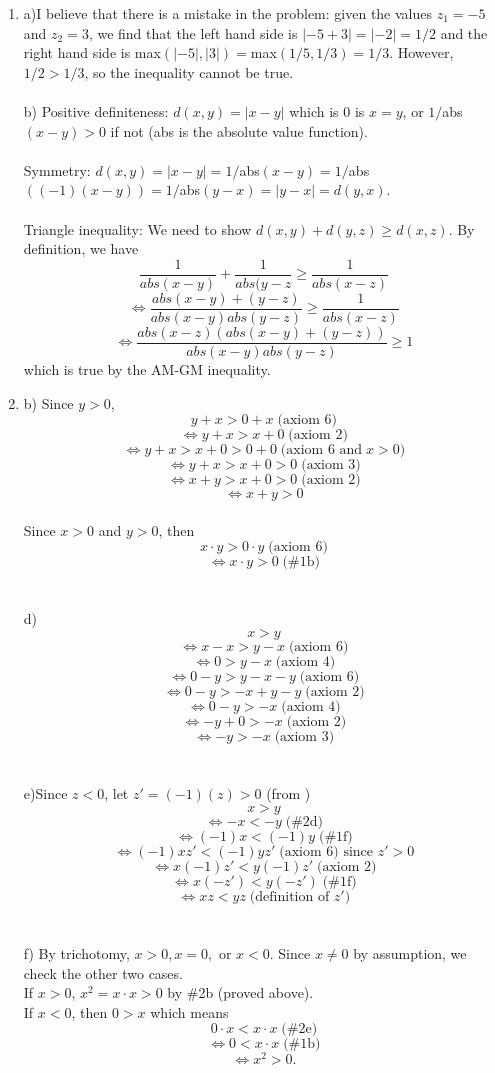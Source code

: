 \documentclass{article}
\begin{document}
\begin{enumerate}
\item
a)I believe that there is a mistake in the problem: given the values $z_1 = -5$ and $z_2 = 3$, we find that the left hand side is $|-5+3| = |-2| = 1/2$ and the right hand side is max$(|-5|,|3|)=$max$(1/5,1/3)=1/3$. However, $1/2 > 1/3$, so the inequality cannot be true.
\\\\b) Positive definiteness: $d(x,y) = |x-y|$ which is 0 is $x=y$, or $1/$abs$(x-y)>0$ if not (abs is the absolute value function). 
\\\\Symmetry: $d(x,y) = |x-y| = 1/$abs$(x-y) = 1/$abs$((-1)(x-y)) = 1/$abs$(y-x)=|y-x| = d(y,x)$.
\\\\Triangle inequality: We need to show $d(x,y)+d(y,z) \ge d(x,z)$.
By definition, we have \[\frac{1}{abs(x-y)} + \frac{1}{abs(y-z} \ge \frac{1}{abs(x-z)}\]
\[\Leftrightarrow\frac{abs(x-y)+(y-z)}{abs(x-y)abs(y-z)} \ge \frac{1}{abs(x-z)}\]
\[\Leftrightarrow\frac{abs(x-z)(abs(x-y)+(y-z))}{abs(x-y)abs(y-z)} \ge 1\]
which is true by the AM-GM inequality. 
\item
b) Since $y > 0$, \[y+x > 0+x \;\textrm{(axiom 6)}\]
\[\Leftrightarrow y+x>x+0 \;\textrm{(axiom 2)}\]
\[\Leftrightarrow y+x>x+0>0+0 \;\textrm{(axiom 6 and}\;x>0)\]
\[\Leftrightarrow y+x>x+0>0 \;\textrm{(axiom 3)}\]
\[\Leftrightarrow x+y>x+0>0 \;\textrm{(axiom 2)}\]
\[\Leftrightarrow x+y>0\]
\\Since $x>0$ and $y>0$, then \[x\cdot y > 0 \cdot y\;\textrm{(axiom 6)}\]
\[\Leftrightarrow x\cdot y>0 \;\textrm{(\#1b)}\]
\\\\d)\[x>y\]
\[\Leftrightarrow x-x > y-x \; \textrm{(axiom 6)}\]
\[\Leftrightarrow 0 > y-x \; \textrm{(axiom 4)}\]
\[\Leftrightarrow 0-y > y-x-y \; \textrm{(axiom 6)}\]
\[\Leftrightarrow 0-y > -x+y-y \; \textrm{(axiom 2)}\]
\[\Leftrightarrow 0-y > -x \; \textrm{(axiom 4)}\]
\[\Leftrightarrow -y+0 > -x \; \textrm{(axiom 2)}\]
\[\Leftrightarrow -y > -x \; \textrm{(axiom 3)}\]
\\\\e)Since $z<0$, let $z'=(-1)(z)>0$ (from )
\[x>y\]
\[\Leftrightarrow -x<-y\; \textrm{(\#2d)}\]
\[\Leftrightarrow (-1)x<(-1)y\; \textrm{(\#1f)}\]
\[\Leftrightarrow (-1)xz'<(-1)yz'\; \textrm{(axiom 6) since }z'>0\]
\[\Leftrightarrow x(-1)z'<y(-1)z'\; \textrm{(axiom 2)}\]
\[\Leftrightarrow x(-z')<y(-z')\; \textrm{(\#1f)}\]
\[\Leftrightarrow xz<yz\; \textrm{(definition of }z')\]
\\\\f) By trichotomy, $x>0, x=0,$ or $x<0$. Since $x\neq 0$ by assumption, we check the other two cases. \\If $x>0$, $x^2 = x\cdot x > 0$ by \#2b (proved above). 
\\If $x<0$, then $0>x$ which means \[0\cdot x < x \cdot x\;\textrm{(\#2e)}\]
\[\Leftrightarrow 0<x\cdot x\;\textrm{(\#1b)}\]
\[\Leftrightarrow x^2>0.\]

\end{enumerate}
\end{document}
